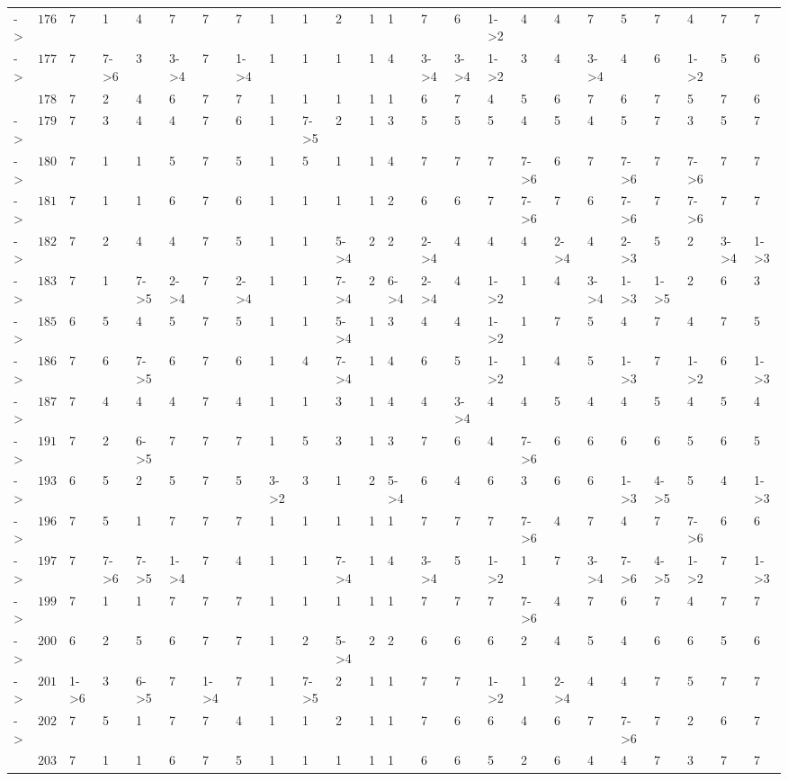 \documentclass[6pt]{article}
\begin{document}
\begin{landscape}
{\begin{longtable}{lrllllllllllllllllllllll}
\newpage
-\textgreater &$176$&7&1&4&7&7&7&1&1&2&1&1&7&6&1-\textgreater 2&4&4&7&5&7&4&7&7\tabularnewline
-\textgreater &$177$&7&7-\textgreater 6&3&3-\textgreater 4&7&1-\textgreater 4&1&1&1&1&4&3-\textgreater 4&3-\textgreater 4&1-\textgreater 2&3&4&3-\textgreater 4&4&6&1-\textgreater 2&5&6\tabularnewline
&$178$&7&2&4&6&7&7&1&1&1&1&1&6&7&4&5&6&7&6&7&5&7&6\tabularnewline
-\textgreater &$179$&7&3&4&4&7&6&1&7-\textgreater 5&2&1&3&5&5&5&4&5&4&5&7&3&5&7\tabularnewline
-\textgreater &$180$&7&1&1&5&7&5&1&5&1&1&4&7&7&7&7-\textgreater 6&6&7&7-\textgreater 6&7&7-\textgreater 6&7&7\tabularnewline
-\textgreater &$181$&7&1&1&6&7&6&1&1&1&1&2&6&6&7&7-\textgreater 6&7&6&7-\textgreater 6&7&7-\textgreater 6&7&7\tabularnewline
-\textgreater &$182$&7&2&4&4&7&5&1&1&5-\textgreater 4&2&2&2-\textgreater 4&4&4&4&2-\textgreater 4&4&2-\textgreater 3&5&2&3-\textgreater 4&1-\textgreater 3\tabularnewline
-\textgreater &$183$&7&1&7-\textgreater 5&2-\textgreater 4&7&2-\textgreater 4&1&1&7-\textgreater 4&2&6-\textgreater 4&2-\textgreater 4&4&1-\textgreater 2&1&4&3-\textgreater 4&1-\textgreater 3&1-\textgreater 5&2&6&3\tabularnewline
-\textgreater &$185$&6&5&4&5&7&5&1&1&5-\textgreater 4&1&3&4&4&1-\textgreater 2&1&7&5&4&7&4&7&5\tabularnewline
-\textgreater &$186$&7&6&7-\textgreater 5&6&7&6&1&4&7-\textgreater 4&1&4&6&5&1-\textgreater 2&1&4&5&1-\textgreater 3&7&1-\textgreater 2&6&1-\textgreater 3\tabularnewline
-\textgreater &$187$&7&4&4&4&7&4&1&1&3&1&4&4&3-\textgreater 4&4&4&5&4&4&5&4&5&4\tabularnewline
-\textgreater &$191$&7&2&6-\textgreater 5&7&7&7&1&5&3&1&3&7&6&4&7-\textgreater 6&6&6&6&6&5&6&5\tabularnewline
-\textgreater &$193$&6&5&2&5&7&5&3-\textgreater 2&3&1&2&5-\textgreater 4&6&4&6&3&6&6&1-\textgreater 3&4-\textgreater 5&5&4&1-\textgreater 3\tabularnewline
-\textgreater &$196$&7&5&1&7&7&7&1&1&1&1&1&7&7&7&7-\textgreater 6&4&7&4&7&7-\textgreater 6&6&6\tabularnewline
-\textgreater &$197$&7&7-\textgreater 6&7-\textgreater 5&1-\textgreater 4&7&4&1&1&7-\textgreater 4&1&4&3-\textgreater 4&5&1-\textgreater 2&1&7&3-\textgreater 4&7-\textgreater 6&4-\textgreater 5&1-\textgreater 2&7&1-\textgreater 3\tabularnewline
-\textgreater &$199$&7&1&1&7&7&7&1&1&1&1&1&7&7&7&7-\textgreater 6&4&7&6&7&4&7&7\tabularnewline
-\textgreater &$200$&6&2&5&6&7&7&1&2&5-\textgreater 4&2&2&6&6&6&2&4&5&4&6&6&5&6\tabularnewline
-\textgreater &$201$&1-\textgreater 6&3&6-\textgreater 5&7&1-\textgreater 4&7&1&7-\textgreater 5&2&1&1&7&7&1-\textgreater 2&1&2-\textgreater 4&4&4&7&5&7&7\tabularnewline
-\textgreater &$202$&7&5&1&7&7&4&1&1&2&1&1&7&6&6&4&6&7&7-\textgreater 6&7&2&6&7\tabularnewline
&$203$&7&1&1&6&7&5&1&1&1&1&1&6&6&5&2&6&4&4&7&3&7&7\tabularnewline

\end{longtable}}
\end{landscape}
\end{document}

